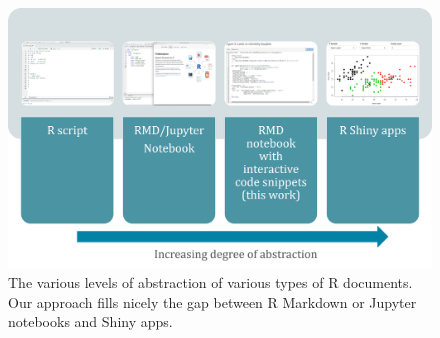 \begin{Schunk}
\begin{figure}
\includegraphics[width=\textwidth]{learnr_abstraction} \caption[The various levels of abstraction of various types of R documents]{The various levels of abstraction of various types of R documents. Our approach fills nicely the gap between R Markdown or Jupyter notebooks and Shiny apps.}\label{fig:fig1}
\end{figure}
\end{Schunk}

